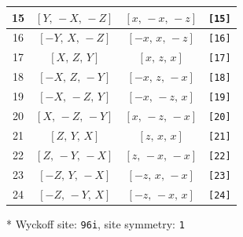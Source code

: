 \documentclass[fleqn,8pt]{jsarticle}
\begin{document}
\begin{longtable}{cccc}
15 & $\left[ Y,\, - X,\, - Z \right]$ & $\left[ x,\, - x,\, - z \right]$ & {\tt [15]} \\ \hline
16 & $\left[ - Y,\, X,\, - Z \right]$ & $\left[ - x,\, x,\, - z \right]$ & {\tt [16]} \\ \hline
17 & $\left[ X,\, Z,\, Y \right]$ & $\left[ x,\, z,\, x \right]$ & {\tt [17]} \\ \hline
18 & $\left[ - X,\, Z,\, - Y \right]$ & $\left[ - x,\, z,\, - x \right]$ & {\tt [18]} \\ \hline
19 & $\left[ - X,\, - Z,\, Y \right]$ & $\left[ - x,\, - z,\, x \right]$ & {\tt [19]} \\ \hline
20 & $\left[ X,\, - Z,\, - Y \right]$ & $\left[ x,\, - z,\, - x \right]$ & {\tt [20]} \\ \hline
21 & $\left[ Z,\, Y,\, X \right]$ & $\left[ z,\, x,\, x \right]$ & {\tt [21]} \\ \hline
22 & $\left[ Z,\, - Y,\, - X \right]$ & $\left[ z,\, - x,\, - x \right]$ & {\tt [22]} \\ \hline
23 & $\left[ - Z,\, Y,\, - X \right]$ & $\left[ - z,\, x,\, - x \right]$ & {\tt [23]} \\ \hline
24 & $\left[ - Z,\, - Y,\, X \right]$ & $\left[ - z,\, - x,\, x \right]$ & {\tt [24]} \\
\end{longtable}
* Wyckoff site: {\tt 96i}, site symmetry: {\tt 1}
\renewcommand{\arraystretch}{1.2}
\end{document}
